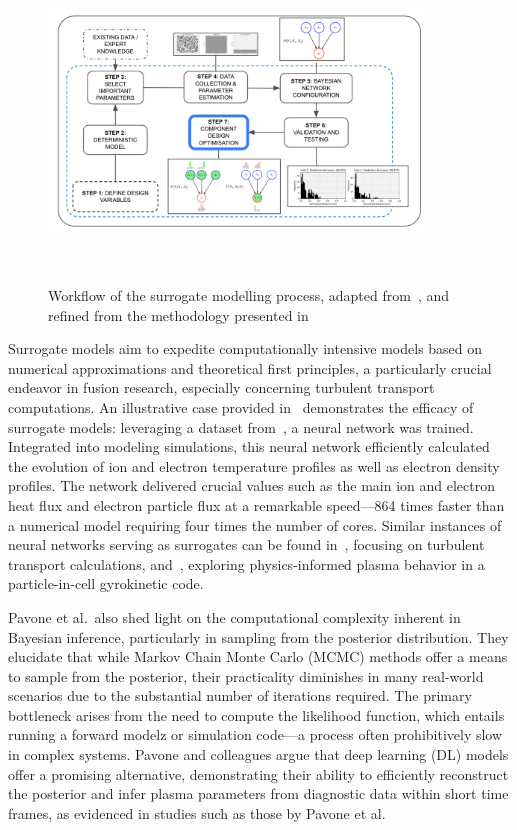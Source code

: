 \documentclass[journal]{IEEEtran}
\begin{document}
\begin{figure}[t]
    \centering
    \includegraphics[width=0.9\textwidth]{figures/methodology/workflows/workflow_v5.png}
    \caption{Workflow of the surrogate modelling process, adapted from~\cite{Conti2019}, and refined from the methodology presented in~\cite{Griffiths2024}}~\label{fig:workflow}
\end{figure}


Surrogate models aim to expedite computationally intensive models based on numerical approximations and theoretical first principles, a particularly crucial endeavor in fusion research, especially concerning turbulent transport computations. An illustrative case provided in~\cite{Van2020} demonstrates the efficacy of surrogate models: leveraging a dataset from~\cite{Citrin2017}, a neural network was trained. Integrated into modeling simulations, this neural network efficiently calculated the evolution of ion and electron temperature profiles as well as electron density profiles. The network delivered crucial values such as the main ion and electron heat flux and electron particle flux at a remarkable speed—864 times faster than a numerical model requiring four times the number of cores. Similar instances of neural networks serving as surrogates can be found in~\cite{Meneghini2017}, focusing on turbulent transport calculations, and~\cite{Miller2021}, exploring physics-informed plasma behavior in a particle-in-cell gyrokinetic code.

Pavone et al.\ also shed light on the computational complexity inherent in Bayesian inference, particularly in sampling from the posterior distribution. They elucidate that while Markov Chain Monte Carlo (MCMC) methods offer a means to sample from the posterior, their practicality diminishes in many real-world scenarios due to the substantial number of iterations required. The primary bottleneck arises from the need to compute the likelihood function, which entails running a forward modelz or simulation code—a process often prohibitively slow in complex systems. Pavone and colleagues argue that deep learning (DL) models offer a promising alternative, demonstrating their ability to efficiently reconstruct the posterior and infer plasma parameters from diagnostic data within short time frames, as evidenced in studies such as those by Pavone et al.~\cite{Pavone2018,Pavone2019, Pavone2020, Pavone2021}
\end{document}
